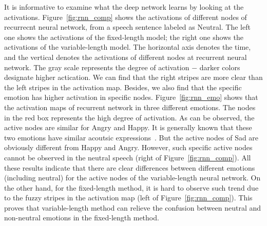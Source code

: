 \documentclass[a4paper]{article}
\begin{document}
It is informative to examine what the deep network learns by looking at the activations. Figure~\ref{fig:rnn_comp} shows the activations of different nodes of recurrecnt neural network, from a speech sentence labeled as Neutral. The left one shows the activations of the fixed-length model; the right one shows the activations of the variable-length model. The horizontal axis denotes the time, and the vertical denotes the activations of different nodes at recurrent neural network. The gray scale represents the degree of activation $-$ darker colors designate higher actication. We can find that the right stripes are more clear than the left stripes in the activation map. Besides, we also find that the specific emotion has higher activation in specific nodes. Figure~\ref{fig:rnn_emo} shows that the activation maps of recurrent network in three different emotions. The nodes in the red box represents the high degree of activation. As can be observed, the active nodes are similar for Angry and Happy. It is generally known that these two emotions have similar acoutsic expressions~\cite{ma2017}. But the active nodes of Sad are obviously different from Happy and Angry. However, such specific active nodes cannot be observed in the neutral speech (right of Figure~\ref{fig:rnn_comp}). All these results indicate that there are clear differences between different emotions (including neutral) for the active nodes of the variable-length neural network.  On the other hand, for the fixed-length method, it is hard to observe such trend due to the fuzzy stripes in the activation map (left of Figure~\ref{fig:rnn_comp}). This proves that variable-length method can relieve the confusion between neutral and non-neutral emotions in the fixed-length method.
\end{document}

